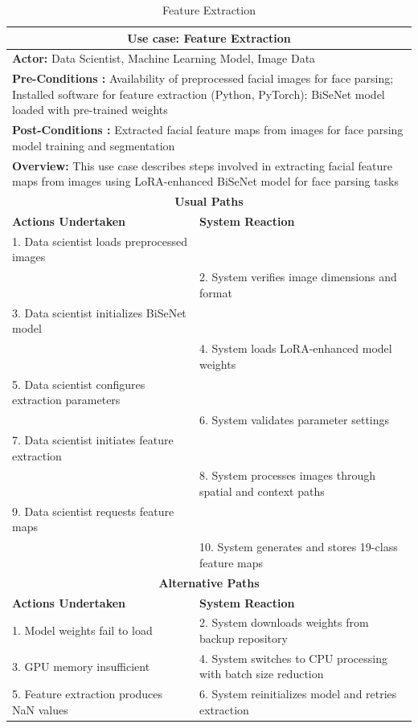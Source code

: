 \documentclass[12pt,a4paper]{report}
\begin{document}
\begin{table}[H]
\centering
\caption{Feature Extraction}
\begin{tabular}{|p{6cm}|p{6cm}|}
\hline
\multicolumn{2}{|c|}{\textbf{Use case: Feature Extraction}} \\
\hline
\multicolumn{2}{|p{12cm}|}{\textbf{Actor:} Data Scientist, Machine Learning Model, Image Data} \\
\hline
\multicolumn{2}{|p{12cm}|}{\textbf{Pre-Conditions :} Availability of preprocessed facial images for face parsing; Installed software for feature extraction (Python, PyTorch); BiSeNet model loaded with pre-trained weights} \\
\hline
\multicolumn{2}{|p{12cm}|}{\textbf{Post-Conditions :} Extracted facial feature maps from images for face parsing model training and segmentation} \\
\hline
\multicolumn{2}{|p{12cm}|}{\textbf{Overview:} This use case describes steps involved in extracting facial feature maps from images using LoRA-enhanced BiSeNet model for face parsing tasks} \\
\hline
\multicolumn{2}{|c|}{\textbf{Usual Paths}} \\
\hline
\textbf{Actions Undertaken} & \textbf{System Reaction} \\
\hline
1. Data scientist loads preprocessed images & \\
\hline
 & 2. System verifies image dimensions and format \\
\hline
3. Data scientist initializes BiSeNet model & \\
\hline
 & 4. System loads LoRA-enhanced model weights \\
\hline
5. Data scientist configures extraction parameters & \\
\hline
 & 6. System validates parameter settings \\
\hline
7. Data scientist initiates feature extraction & \\
\hline
 & 8. System processes images through spatial and context paths \\
\hline
9. Data scientist requests feature maps & \\
\hline
 & 10. System generates and stores 19-class feature maps \\
\hline
\multicolumn{2}{|c|}{\textbf{Alternative Paths}} \\
\hline
\textbf{Actions Undertaken} & \textbf{System Reaction} \\
\hline
1. Model weights fail to load & 2. System downloads weights from backup repository \\
\hline
3. GPU memory insufficient & 4. System switches to CPU processing with batch size reduction \\
\hline
5. Feature extraction produces NaN values & 6. System reinitializes model and retries extraction \\
\hline
\end{tabular}
\end{table}
\end{document}
